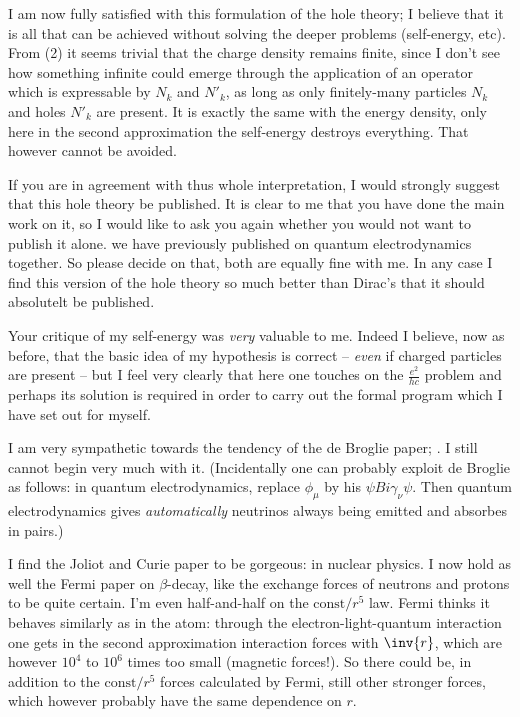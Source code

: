 \documentclass{article}
\begin{document}
I am now fully satisfied with this formulation of the hole theory; I believe that it is all that can be achieved without solving the deeper problems (self-energy, etc). From (2) it seems trivial that the charge density remains finite, since I don't see how something infinite could emerge through the application of an operator which is expressable by $N_k$ and ${N'}_k$, as long as only finitely-many particles $N_k$ and holes ${N'}_k$ are present. It is exactly the same with the energy density, only here in the second approximation the self-energy destroys everything. That however cannot be avoided.

If you are in agreement with thus whole interpretation, I would strongly suggest that this hole theory be published. It is clear to me that you have done the main work on it, so I would like to ask you again whether you would not want to publish it alone.  we have previously published on quantum electrodynamics together. So please decide on that, both are equally fine with me. In any case I find this version of the hole theory so much better than Dirac's that it should absolutelt be published.

Your critique of my self-energy  was \textit{very} valuable to me. Indeed I believe, now as before, that the basic idea of my hypothesis is correct -- \textit{even} if charged particles are present -- but I feel very clearly that here one touches on the $\frac{e^2}{hc}$ problem and perhaps its solution is required in order to carry out the formal program which I have set out for myself.

I am very sympathetic towards the tendency of the de Broglie paper; . I still cannot begin very much with it. (Incidentally one can probably exploit de Broglie as follows: in quantum electrodynamics, replace $\phi_\mu$ by his $\psi B i \gamma_\nu \psi$. Then quantum electrodynamics gives \textit{automatically} neutrinos always being emitted and absorbes in pairs.)

I find the Joliot and Curie paper to be gorgeous:  in nuclear physics. I now hold as well the Fermi paper on $\beta$-decay, like the exchange forces of neutrons and protons to be quite certain. I'm even half-and-half on the $\text{const}/r^5$ law. Fermi thinks it behaves similarly as in the atom: through the electron-light-quantum interaction one gets in the second approximation interaction forces with $\inv{r}$, which are however $10^4$ to $10^6$ times too small (magnetic forces!). So there could be, in addition to the $\text{const}/r^5$ forces calculated by Fermi, still other stronger forces, which however probably have the same dependence on $r$.
\end{document}
